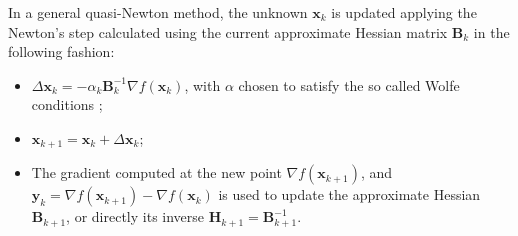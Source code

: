 In a general quasi-Newton method, the unknown \(\mathbf{x}_{k}\) is
updated applying the Newton's step calculated using the current
approximate Hessian matrix \(\mathbf{B}_{k}\) in the following fashion:
\begin{itemize}
\item \(\Delta \mathbf{x}_{k} = -\alpha_{k}\mathbf{B}_{k}^{-1}\nabla
  f(\mathbf{x}_{k})\), with \(\alpha\) chosen to satisfy the so called
  Wolfe conditions \cite[p.~34]{nocedal&wright};

\item \(\mathbf{x}_{k+1} = \mathbf{x}_{k} + \Delta\mathbf{x}_{k}\);

\item The gradient computed at the new point \(\nabla
  f(\mathbf{x}_{k+1})\), and \(\mathbf{y}_{k} = \nabla
  f(\mathbf{x}_{k+1}) - \nabla f(\mathbf{x}_{k})\) is used to update the
  approximate Hessian \(\mathbf{B}_{k+1}\), or directly its inverse
  \(\mathbf{H}_{k+1} = \mathbf{B}_{k+1}^{-1}\).
\end{itemize}

